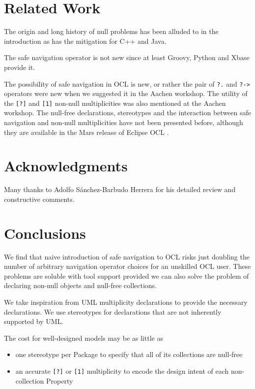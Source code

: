 \documentclass{llncs}
\begin{document}
\section{Related Work}\label{Related Work}

The origin and long history of null problems has been alluded to in the introduction as has the mitigation for C++ and Java.

The safe navigation operator is not new since at least Groovy, Python and Xbase provide it.

The possibility of safe navigation in OCL is new, or rather the pair of \verb$?.$ and \verb$?->$ operators were new when we suggested it in the Aachen workshop\cite{aachen}. The utility of the \verb$[?]$ and \verb$[1]$ non-null multiplicities was also mentioned at the Aachen workshop. The null-free declarations, stereotypes and the interaction between safe navigation and non-null multiplicities have not been presented before, although they are available in the Mars release of Eclipse OCL \cite{Mars-OCL}. 

\section{Acknowledgments}

Many thanks to Adolfo S\'{a}nchez-Barbudo Herrera for his detailed review and constructive comments.
%
\section{Conclusions}\label{Conclusions}
%
We find that naive introduction of safe navigation to OCL risks just doubling the number of arbitrary navigation operator choices for an unskilled OCL user. These problems are soluble with tool support provided we can also solve the problem of declaring non-null objects and null-free collections.

We take inspiration from UML multiplicity declarations to provide the necessary declarations. We use stereotypes for declarations that are not inherently supported by UML.

The cost for well-designed models may be as little as 
\begin{itemize}
\item one stereotype per Package to specify that all of its collections are null-free
\item an accurate \verb$[?]$ or \verb$[1]$ multiplicity to encode the design intent of each non-collection Property
\end{itemize}
\end{document}
